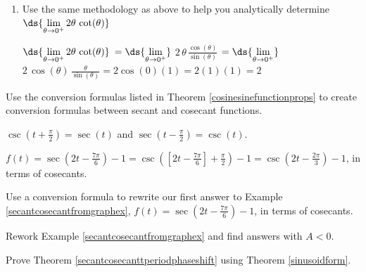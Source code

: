 \documentclass{ximera}
\begin{document}
\begin{problem}
\begin{enumerate}
\item  Use the same methodology as above  to help you analytically determine $\ds{\lim_{\theta \rightarrow 0^{+}} 2 \theta \, \cot(\theta)}$

\begin{solution}
    $\ds{\lim_{\theta \rightarrow 0^{+}} 2 \theta \, \cot(\theta)}$ $= \ds{\lim_{\theta \rightarrow 0^{+}}}$ $2 \, \theta \, \frac{\cos(\theta)}{\sin(\theta)}$  $= \ds{\lim_{\theta \rightarrow 0^{+}}}$ $2 \, \cos(\theta) \, \frac{\theta}{\sin(\theta)} = 2\cos(0)(1) = 2(1)(1) = 2$
\end{solution}


\setcounter{HW}{\value{enumi}}
\end{enumerate}

\end{problem}


\begin{problem}\label{secantcosecantshiftexercise}  
    Use the conversion formulas listed in Theorem \ref{cosinesinefunctionprops} to create conversion formulas between secant and cosecant functions.

    \begin{solution}
        $\csc\left(t + \frac{\pi}{2} \right) = \sec(t)$ and $\sec\left(t - \frac{\pi}{2} \right) = \csc(t)$.
    \end{solution}

    \begin{solution}
         $f(t) = \sec\left( 2 t - \frac{7\pi}{6} \right) -1 = \csc\left( \left[2 t - \frac{7\pi}{6}\right] + \frac{\pi}{2}  \right) -1 = \csc\left( 2 t - \frac{2\pi}{3} \right) -1 $, in terms of cosecants.
    \end{solution}
\end{problem}

\begin{problem}
    Use a conversion formula to rewrite our first answer to Example \ref{secantcosecantfromgraphex}, $f(t) = \sec\left( 2 t - \frac{7\pi}{6} \right) -1$, in terms of cosecants.
\end{problem}


\begin{problem}\label{NegativeAsecantcosecant} 
    Rework Example \ref{secantcosecantfromgraphex} and find answers with $A<0$.
\end{problem}

\begin{problem}\label{sinusoidformseccscexercise}  
    Prove Theorem \ref{secantcosecanttperiodphaseshift}    using Theorem  \ref{sinusoidform}.
\end{problem}
\end{document}
